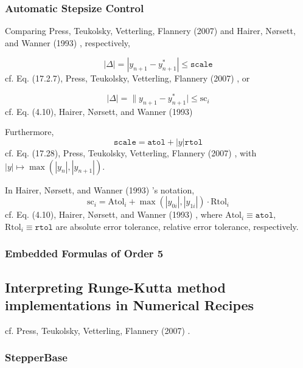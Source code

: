 \documentclass[10pt]{amsart}
\begin{document}
\begin{multicols*}{2}
\subsubsection{Automatic Stepsize Control}

Comparing Press, Teukolsky, Vetterling, Flannery (2007) \cite{PTVF2007} and Hairer, N\o rsett, and Wanner (1993) \cite{HNW1993}, respectively,

\begin{equation}
	|\Delta | = |y_{n+1} - y_{n+1}^* | \leq \texttt{scale}
\end{equation}
cf. Eq. (17.2.7), Press, Teukolsky, Vetterling, Flannery (2007) \cite{PTVF2007}, or

\begin{equation}
	| \Delta | = \| y_{n+1}- y^*_{n+1} | \leq \text{sc}_i
\end{equation}
cf. Eq. (4.10), Hairer, N\o rsett, and Wanner (1993) \cite{HNW1993}

Furthermore,
\begin{equation}
	\texttt{scale} = \texttt{atol} + |y| \texttt{rtol}
\end{equation}
cf. Eq. (17.28), Press, Teukolsky, Vetterling, Flannery (2007) \cite{PTVF2007}, with $|y| \mapsto \max{(|y_n|, |y_{n+1}|)}$.

In Hairer, N\o rsett, and Wanner (1993) \cite{HNW1993}'s notation,
\begin{equation}
	\text{sc}_i = \text{Atol}_i + \max{(|y_{0i}|, |y_{1i}|)} \cdot \text{Rtol}_i
\end{equation}
cf. Eq. (4.10), Hairer, N\o rsett, and Wanner (1993) \cite{HNW1993}, where $\text{Atol}_i \equiv \texttt{atol}$, $\text{Rtol}_i \equiv \texttt{rtol}$ are absolute error tolerance, relative error tolerance, respectively.

\subsubsection{Embedded Formulas of Order 5}



\subsection{Interpreting Runge-Kutta method implementations in \textbf{Numerical Recipes}}

cf. Press, Teukolsky, Vetterling, Flannery (2007) \cite{PTVF2007}.

\subsubsection{StepperBase}


\end{multicols*}
\end{document}
